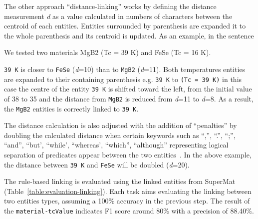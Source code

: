 \documentclass[]{interact}
\theoremstyle{plain}%
\theoremstyle{definition}
\theoremstyle{remark}
\begin{document}

The other approach ``distance-linking'' works by defining the distance measurement \textit{d} as a value calculated in numbers of characters between the centroid of each entities.
Entities surrounded by parenthesis are expanded it to the whole parenthesis and its centroid is updated.
As an example, in the sentence
\begin{displayquote}
    We tested two materials MgB2 (Tc = 39 K) and FeSe (Tc = 16 K).
\end{displayquote}

\texttt{39 K} is closer to \texttt{FeSe} (\textit{d}=10) than to \texttt{MgB2} (\textit{d}=11).
Both temperatures entities are expanded to their containing parenthesis e.g. \texttt{39 K} to \texttt{(Tc = 39 K)} in this case the centre of the entity \texttt{39 K} is shifted toward the left, from the initial value of 38 to 35 and the distance from \texttt{MgB2} is reduced from \textit{d}=11 to \textit{d}=8.
As a result, the \texttt{MgB2} entities is correctly linked to \texttt{39 K}.

The distance calculation is also adjusted with the addition of ``penalties'' by doubling the calculated distance when certain keywords such as ``,'', ``.'', ``;'', ``and'', ``but', ``while', ``whereas', ``which'', ``although'' representing logical separation of predicates appear between the two entities~\cite{oka2021table}.
In the above example, the distance between \texttt{39 K} and \texttt{FeSe} will be doubled (\textit{d}=20).

The rule-based linking is evaluated using the linked entities from SuperMat~\cite{foppiano2021supermat} (Table~\ref{table:evaluation-linking}).
Each task aims evaluating the linking between two entities types, assuming a 100\% accuracy in the previous step.
The result of the \texttt{material-tcValue} indicates F1 score around 80\% with a precision of 88.40\%.
\end{document}

